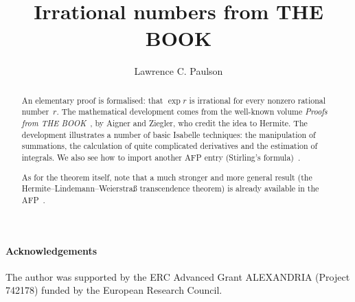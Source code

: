 \documentclass[11pt,a4paper]{article}
\begin{document}
\title{Irrational numbers from THE BOOK}
\author{Lawrence C. Paulson}
\maketitle

\begin{abstract}
An elementary proof is formalised: that $\exp r$ is irrational for every nonzero rational number~$r$. The mathematical development comes from the well-known volume \emph{Proofs from THE BOOK}~\cite[pp.--2]{aigner-proofs}, by Aigner and Ziegler, who credit the idea to Hermite. The development illustrates a number of basic Isabelle techniques: the manipulation of summations, the calculation of quite complicated derivatives and the estimation of integrals.
We also see how to import another AFP entry (Stirling's formula)~\cite{Stirling_Formula-AFP}.

As for the theorem itself, note that a much stronger and more general result (the Hermite--Lindemann--Weierstra\ss{} transcendence theorem) is already available in the AFP~\cite{Hermite_Lindemann-AFP}.
\end{abstract}

\newpage
\tableofcontents

\paragraph*{Acknowledgements}
The author was supported by the ERC Advanced Grant ALEXANDRIA (Project 742178) funded by the European Research Council. 

\newpage





\end{document}
